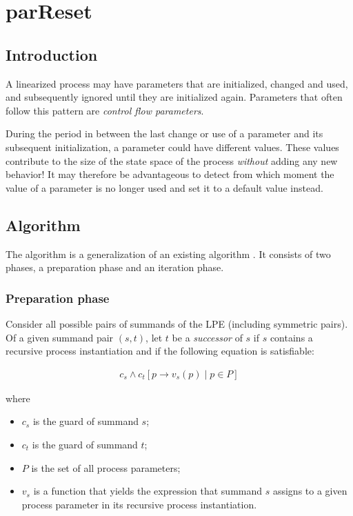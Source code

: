 \chapter{parReset}

\section{Introduction}

A linearized process may have parameters that are initialized, changed and used, and subsequently ignored until they are initialized again.
Parameters that often follow this pattern are \emph{control flow parameters}.

During the period in between the last change or use of a parameter and its subsequent initialization, a parameter could have different values.
These values contribute to the size of the state space of the process \emph{without} adding any new behavior!
It may therefore be advantageous to detect from which moment the value of a parameter is no longer used and set it to a default value instead.

\section{Algorithm}

The algorithm is a generalization of an existing algorithm \cite{van2009state}.
It consists of two phases, a preparation phase and an iteration phase.

\subsection{Preparation phase}

Consider all possible pairs of summands of the LPE (including symmetric pairs).
Of a given summand pair $(s, t)$, let $t$ be a \emph{successor} of $s$ if $s$ contains a recursive process instantiation and if the following equation is satisfiable:

\begin{align*}
c_s \land {c_t}[p \rightarrow v_s(p) \;|\; p \in P]
\end{align*}

where

\begin{itemize}
\item $c_s$ is the guard of summand $s$;
\item $c_t$ is the guard of summand $t$;
\item $P$ is the set of all process parameters;
\item $v_s$ is a function that yields the expression that summand $s$ assigns to a given process parameter in its recursive process instantiation.
\end{itemize}

